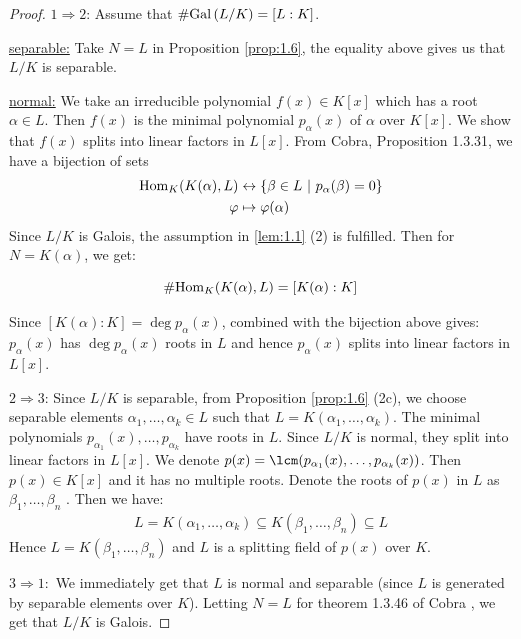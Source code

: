 \documentclass[twoside = false,	%
		headsepline,		%
		parskip = true,
		]{scrbook}						%
\begin{document}
        \begin{proof}
        	$1 \Rightarrow 2$: Assume that $\#\mathrm{Gal}\left( L/K\right) = [L:K]$.
        	
        	\underline{separable:} Take $N=L$ in Proposition \ref{prop:1.6}, the equality above gives us that $L/K$ is separable.
        	
        	\underline{normal:} We take an irreducible polynomial $f(x) \in K[x]$ which has a root $\alpha \in L$. Then $f(x)$ is the minimal polynomial $p_\alpha(x)$ of $\alpha$ over $K[x]$. We show that $f(x)$ splits into linear factors in $L[x]$.
        	From Cobra, Proposition 1.3.31, we have a bijection of sets
        	\begin{align*}
        			\mathrm{Hom}_K(K(\alpha),L) &\leftrightarrow \{\beta \in L \ | \ p_\alpha(\beta) = 0\} \\
        			\varphi &\mapsto \varphi(\alpha)
        	\end{align*}
        	Since $L/K$ is Galois, the assumption in \ref{lem:1.1} (2) is fulfilled. Then for $N=K(\alpha)$, we get:
        	
        	\begin{equation*}
        	    \#\mathrm{Hom}_K(K(\alpha),L) = [K(\alpha):K]
        	\end{equation*}
        	
        	Since $[K(\alpha):K] = \deg p_\alpha(x) $, combined with the bijection above gives: $p_\alpha(x)$ has $\deg p_\alpha(x)$ roots in $L$ and hence $p_\alpha(x)$ splits into linear factors in $L[x]$.
        	
        	$2 \Rightarrow 3$: Since $L/K$ is separable, from Proposition \ref{prop:1.6} (2c), we choose separable elements $\alpha_1,\dots,\alpha_k \in L$ such that $L = K(\alpha_1,\dots,\alpha_k)$. The minimal polynomials $p_{\alpha_1}(x),\dots,p_{\alpha_k}$ have roots in $L$. Since $L/K$ is normal, they split into linear factors in $L[x]$.
        	We denote $p(x) = \lcm(p_{\alpha_1}(x),\dots,p_{\alpha_k}(x))$. Then $p(x) \in K[x]$ and it has no multiple roots. Denote the roots of $p(x)$ in $L$ as $\beta_1, \dots, \beta_n$ . Then we have:
        	\begin{align*}
        		L = K(\alpha_1, \dots, \alpha_k) \subseteq K(\beta_1,\dots,\beta_n)\subseteq L
        	\end{align*}
        	Hence $L = K(\beta_1,\dots,\beta_n)$ and $L$ is a splitting field of $p(x)$ over $K$.
        	
        	$3 \Rightarrow 1:$ We immediately get that $L$ is normal and separable (since $L$ is generated by separable elements over $K$). Letting $N=L$ for theorem 1.3.46 of Cobra \cite{Cobra}, we get that $L/K$ is Galois. 
        \end{proof}
        
\end{document}

